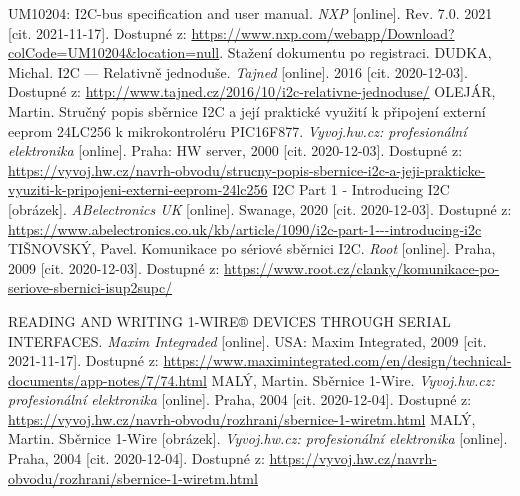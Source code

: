 \begin{thebibliography}{3}
UM10204: I2C-bus specification and user manual. \textit{NXP} [online]. Rev. 7.0. 2021 [cit. 2021-11-17]. Dostupné z: \url{https://www.nxp.com/webapp/Download?colCode=UM10204&location=null}. Stažení dokumentu po registraci.
DUDKA, Michal. I2C --- Relativně jednoduše. \textit{Tajned} [online]. 2016 [cit. 2020-12-03]. Dostupné z: \url{http://www.tajned.cz/2016/10/i2c-relativne-jednoduse/}
OLEJÁR, Martin. Stručný popis sběrnice I2C a její praktické využití k připojení externí eeprom 24LC256 k mikrokontroléru PIC16F877. \textit{Vyvoj.hw.cz: profesionální elektronika} [online]. Praha: HW server, 2000 [cit. 2020-12-03]. Dostupné z: \url{https://vyvoj.hw.cz/navrh-obvodu/strucny-popis-sbernice-i2c-a-jeji-prakticke-vyuziti-k-pripojeni-externi-eeprom-24lc256}
I2C Part 1 - Introducing I2C [obrázek]. \textit{ABelectronics UK} [online]. Swanage, 2020 [cit. 2020-12-03]. Dostupné z: \url{https://www.abelectronics.co.uk/kb/article/1090/i2c-part-1---introducing-i2c}
TIŠNOVSKÝ, Pavel. Komunikace po sériové sběrnici I2C. \textit{Root} [online]. Praha, 2009 [cit. 2020-12-03]. Dostupné z: \url{https://www.root.cz/clanky/komunikace-po-seriove-sbernici-isup2supc/}



READING AND WRITING 1-WIRE® DEVICES THROUGH SERIAL INTERFACES. \textit{Maxim Integraded} [online]. USA: Maxim Integrated, 2009 [cit. 2021-11-17]. Dostupné z: \url{https://www.maximintegrated.com/en/design/technical-documents/app-notes/7/74.html}
MALÝ, Martin. Sběrnice 1-Wire. \textit{Vyvoj.hw.cz: profesionální elektronika} [online]. Praha, 2004 [cit. 2020-12-04]. Dostupné z: \url{https://vyvoj.hw.cz/navrh-obvodu/rozhrani/sbernice-1-wiretm.html}
MALÝ, Martin. Sběrnice 1-Wire [obrázek]. \textit{Vyvoj.hw.cz: profesionální elektronika} [online]. Praha, 2004 [cit. 2020-12-04]. Dostupné z: \url{https://vyvoj.hw.cz/navrh-obvodu/rozhrani/sbernice-1-wiretm.html}


\end{thebibliography}
